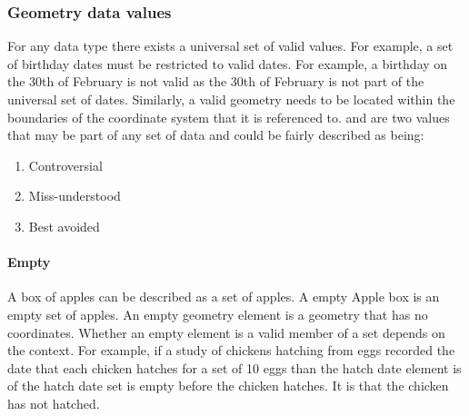 \documentclass[letterpaper,10pt,english]{sphinxmanual}
\begin{document}
\subsubsection{Geometry data values}
\label{\detokenize{concept:geometry-data-values}}
For any data type there exists a universal set of valid values.  For example, a set of birthday dates must be restricted to valid dates.  For example, a birthday on the 30th of February is not valid as the 30th of February is not part of the universal set of dates.  Similarly, a valid geometry needs to be located within the boundaries of the coordinate system that it is referenced to.   and  are two values that may be part of any set of data and could be fairly described as being:
\begin{enumerate}
\def\theenumi{\arabic{enumi}}
\def\labelenumi{\theenumi .}
\makeatletter\def\p@enumii{\p@enumi \theenumi .}\makeatother
\item {} 
Controversial

\item {} 
Miss-understood

\item {} 
Best avoided

\end{enumerate}


\paragraph{Empty}
\label{\detokenize{concept:empty}}
A box of apples can be described as a set of apples.  A empty Apple box is an empty set of apples.  An empty geometry element is a geometry that has no coordinates.  Whether an empty element is a valid member of a set depends on the context.  For example, if a study of chickens hatching from eggs recorded the date that each chicken hatches for a set of 10 eggs than the hatch date element is of the hatch date set is empty before the chicken hatches.  It is  that the chicken has not hatched.
\end{document}
